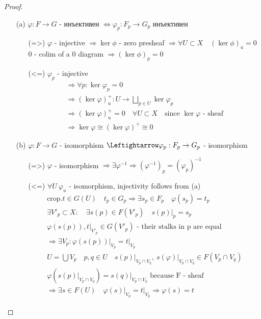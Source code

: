 \begin{proof}
\begin{itemize}
\item[]
\item[(a)]
	$\varphi: F \to G$ - инъективен $\Leftrightarrow \varphi_p: F_p \rightarrow G_p$ инъективен
	\begin{itemize}
	\item[]
	\item[(=>)]
		$\varphi$ - injective $\Rightarrow \ker \phi$ - zero presheaf $\Rightarrow \forall U \subset X\quad (\ker \phi)_u = 0$ 0 - colim of a 0 diagram $\Rightarrow (\ker \phi)_p = 0$
	\item[(<=)]
		$\varphi_p$ - injective 
		\begin{gather*}
		\Rightarrow \forall p: \ker \varphi_p = 0\\
		\Rightarrow (\ker \varphi)^+_u: U \to \bigsqcup_{p \in U} \ker \varphi_p\\
		\Rightarrow (\ker \varphi)^+_u = 0\quad \forall U \subset X\quad \text{since } \ker \varphi \text{ - sheaf}\\
		\Rightarrow \ker \varphi \cong (\ker \varphi)^+ \cong 0
		\end{gather*}
	\end{itemize}
\item[(b)]
	$\varphi: F \to G$ - isomorphism $\Leftightarrow \varphi_p: F_p \to G_p$ - isomorphism
	\begin{itemize}
	\item[]
	\item[(=>)] $\varphi$ - isomorphism $\Rightarrow \exists \varphi^{-1} \Rightarrow (\varphi^{-1})_p = (\varphi_p)^{-1}$
	\item[(<=)] $\forall U\ \varphi_u$ - isomorphism, injectivity follows from (a)
		\begin{gather*}
			\text{crop.} t \in G(U)\quad t_p \in G_p \Rightarrow \exists s_p \in F_p\quad \varphi(s_p) = t_p\\
			\exists V'_p \subset X:\quad \exists s(p) \in F(V'_p)\quad s(p)\bigg|_p = s_p\\
			\varphi(s(p)), t\bigg|_{V'_p} \in G(V'_p) \text{ - their stalks in p are equal}\\
			\Rightarrow \exists V_p: \varphi(s(p))\bigg|_{V_p} = t\bigg|_{V_p}\\
			U = \bigcup V_p\quad p,q \in U\quad s(p)\bigg|_{V_p \cap V_q},\ s(\varphi)\bigg|_{V_p \cap V_q} \in F(V_p \cap V_q)\\
			\varphi(s(p)\bigg|_{V_p \cap V_q}) = s(q)\bigg|_{V_p \cap V_q} \text{ because F - sheaf}\\
			\Rightarrow \exists s \in F(U)\quad \varphi(s)\bigg|_{V_p} = t\bigg|_{V_p}
			\Rightarrow \varphi(s) = t
		\end{gather*}
	\end{itemize}
\end{itemize}
\end{proof}
